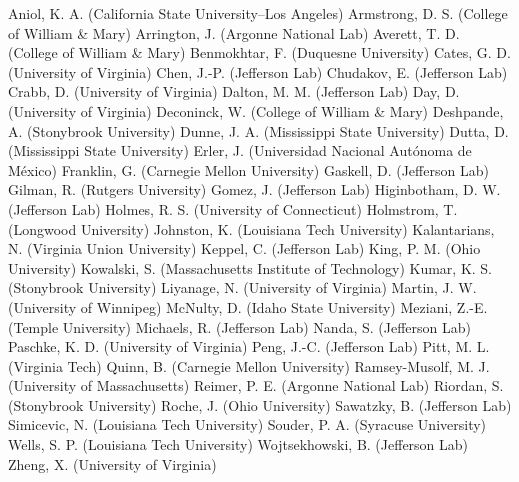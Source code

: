 Aniol, K. A. (California State University--Los Angeles)
Armstrong, D. S. (College of William \& Mary)
Arrington, J. (Argonne National Lab)
Averett, T. D. (College of William \& Mary)
Benmokhtar, F. (Duquesne University)
Cates, G. D. (University of Virginia)
Chen, J.-P. (Jefferson Lab)
Chudakov, E. (Jefferson Lab)
Crabb, D. (University of Virginia)
Dalton, M. M. (Jefferson Lab)
Day, D. (University of Virginia)
Deconinck, W. (College of William \& Mary)
Deshpande, A. (Stonybrook University)
Dunne, J. A. (Mississippi State University)
Dutta, D. (Mississippi State University)
Erler, J. (Universidad Nacional Aut\'onoma de M\'exico)
Franklin, G. (Carnegie Mellon University)
Gaskell, D. (Jefferson Lab)
Gilman, R. (Rutgers University)
Gomez, J. (Jefferson Lab)
Higinbotham, D. W. (Jefferson Lab)
Holmes, R. S. (University of Connecticut)
Holmstrom, T. (Longwood University)
Johnston, K. (Louisiana Tech University)
Kalantarians, N. (Virginia Union University)
Keppel, C. (Jefferson Lab)
King, P. M. (Ohio University)
Kowalski, S. (Massachusetts Institute of Technology)
Kumar, K. S. (Stonybrook University)
Liyanage, N. (University of Virginia)
Martin, J. W. (University of Winnipeg)
McNulty, D. (Idaho State University)
Meziani, Z.-E. (Temple University)
Michaels, R. (Jefferson Lab)
Nanda, S. (Jefferson Lab)
Paschke, K. D. (University of Virginia)
Peng, J.-C. (Jefferson Lab)
Pitt, M. L. (Virginia Tech)
Quinn, B. (Carnegie Mellon University)
Ramsey-Musolf, M. J. (University of Massachusetts)
Reimer, P. E. (Argonne National Lab)
Riordan, S. (Stonybrook University)
Roche, J. (Ohio University)
Sawatzky, B. (Jefferson Lab)
Simicevic, N. (Louisiana Tech University)
Souder, P. A. (Syracuse University)
Wells, S. P. (Louisiana Tech University)
Wojtsekhowski, B. (Jefferson Lab)
Zheng, X. (University of Virginia)

